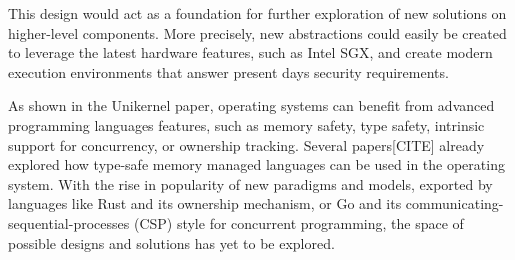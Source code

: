 This design would act as a foundation for further exploration of new solutions on higher-level components. 
More precisely, new abstractions could easily be created to leverage the latest hardware features, such as Intel SGX, and create modern execution environments that answer present days security requirements.

As shown in the Unikernel paper, operating systems can benefit from advanced programming languages features, such as memory safety, type safety, intrinsic support for concurrency, or ownership tracking.
Several papers[CITE] already explored how type-safe memory managed languages can be used in the operating system.
With the rise in popularity of new paradigms and models, exported by languages like Rust and its ownership mechanism, or Go and its communicating-sequential-processes (CSP) style for concurrent programming, the space of possible designs and solutions has yet to be explored.